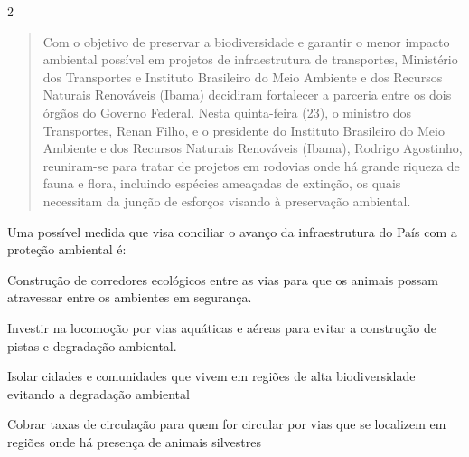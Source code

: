 \num{2}
\begin{quote}
Com o objetivo de preservar a biodiversidade e garantir o menor
impacto ambiental possível em projetos de infraestrutura de
transportes, Ministério dos Transportes e Instituto Brasileiro do Meio
Ambiente e dos Recursos Naturais Renováveis (Ibama) decidiram
fortalecer a parceria entre os dois órgãos do Governo Federal. Nesta
quinta-feira (23), o ministro dos Transportes, Renan Filho, e o
presidente do Instituto Brasileiro do Meio Ambiente e dos Recursos
Naturais Renováveis (Ibama), Rodrigo Agostinho, reuniram-se para
tratar de projetos em rodovias onde há grande riqueza de fauna e
flora, incluindo espécies ameaçadas de extinção, os quais necessitam
da junção de esforços visando à preservação ambiental.

\end{quote}

Uma possível medida que visa conciliar o avanço da infraestrutura do
País com a proteção ambiental é:

\begin{escolha}
\item
  Construção de corredores ecológicos entre as vias para que os animais
  possam atravessar entre os ambientes em segurança.
\item
  Investir na locomoção por vias aquáticas e aéreas para evitar a
  construção de pistas e degradação ambiental.
\item
  Isolar cidades e comunidades que vivem em regiões de alta
  biodiversidade evitando a degradação ambiental
\item
  Cobrar taxas de circulação para quem for circular por vias que se
  localizem em regiões onde há presença de animais silvestres
\end{escolha}


